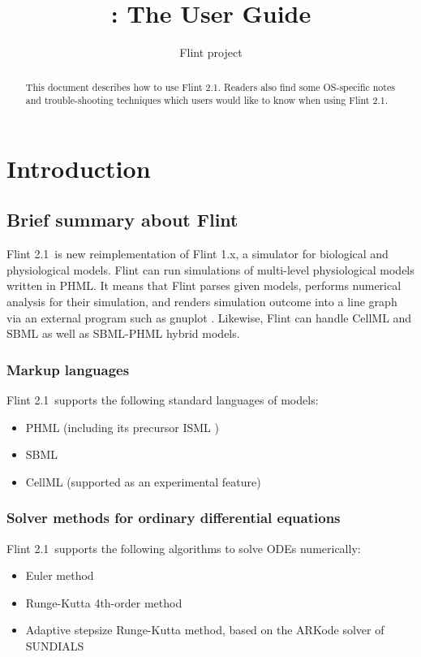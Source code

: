 \documentclass[a4paper,10pt]{report}
\title{\Flint: The User Guide}
\author{Flint project}
\def\FlintVersion{2.1}
\def\Flint{Flint \FlintVersion}
\def\Tagline{a simulator for biological and physiological models}
\begin{document}
\maketitle

\begin{abstract}
This document describes how to use \Flint.
Readers also find some OS-specific notes and trouble-shooting techniques which
users would like to know when using \Flint.
\end{abstract}

\tableofcontents



\chapter{Introduction}

\section{Brief summary about Flint}
\Flint~is new reimplementation of Flint 1.x, \Tagline.
Flint can run simulations of multi-level physiological models written in PHML.
It means that Flint parses given models, performs numerical analysis for their
simulation, and renders simulation outcome into a line graph via an external
program such as gnuplot \cite{gnuplot}.
Likewise, Flint can handle CellML and SBML as well as SBML-PHML hybrid models.

\subsection{Markup languages}
\Flint\ supports the following standard languages of models:
\begin{itemize}
\item PHML \cite{PHML} (including its precursor ISML \cite{ISML})
\item SBML \cite{SBML}
\item CellML \cite{CellML} (supported as an experimental feature)
\end{itemize}

\subsection{Solver methods for ordinary differential equations}
\Flint\ supports the following algorithms to solve ODEs numerically:
\begin{itemize}
\item Euler method
\item Runge-Kutta 4th-order method
\item Adaptive stepsize Runge-Kutta method, based on the ARKode solver of
  SUNDIALS \cite{hindmarsh2005sundials}
\end{itemize}
\end{document}
